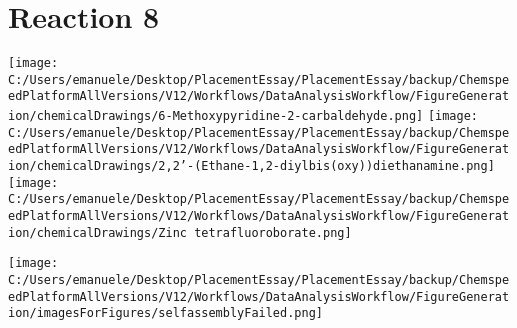 \documentclass{article}%
\begin{document}
\section*{Reaction 8}%
%
\begin{scheme}[H]%
\begin{minipage}{0.5\textwidth}%
\texttt{[image: C:/Users/emanuele/Desktop/PlacementEssay/PlacementEssay/backup/ChemspeedPlatformAllVersions/V12/Workflows/DataAnalysisWorkflow/FigureGeneration/chemicalDrawings/6-Methoxypyridine-2-carbaldehyde.png]}%
\texttt{[image: C:/Users/emanuele/Desktop/PlacementEssay/PlacementEssay/backup/ChemspeedPlatformAllVersions/V12/Workflows/DataAnalysisWorkflow/FigureGeneration/chemicalDrawings/2,2'-(Ethane-1,2-diylbis(oxy))diethanamine.png]}%
\texttt{[image: C:/Users/emanuele/Desktop/PlacementEssay/PlacementEssay/backup/ChemspeedPlatformAllVersions/V12/Workflows/DataAnalysisWorkflow/FigureGeneration/chemicalDrawings/Zinc tetrafluoroborate.png]}%
\end{minipage}%
\begin{minipage}{0.5\textwidth}%
\begin{center}%
\texttt{[image: C:/Users/emanuele/Desktop/PlacementEssay/PlacementEssay/backup/ChemspeedPlatformAllVersions/V12/Workflows/DataAnalysisWorkflow/FigureGeneration/imagesForFigures/selfassemblyFailed.png]}%
\end{center}%
\end{minipage}%
\caption{Self-assembly of components 6, 19, with Zinc(II) in a 3.0:1.5:1.0 molar ratio in CH$_3$CN at 60\textdegree C for 40h. These are the reagents (starting materials) for reaction 8.}%
\end{scheme}%
\end{document}
